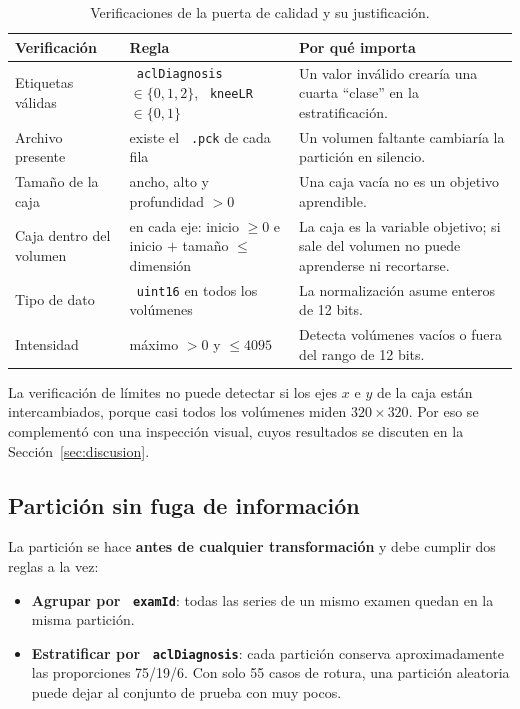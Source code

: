 \documentclass[12pt,letterpaper]{article}
\newcommand{\code}[1]{\texttt{\hyphenchar\font=-1 #1}}
\begin{document}
\begin{table}[!htbp]
\centering
\small
\caption{Verificaciones de la puerta de calidad y su justificación.}
\label{tab:qa}
\begin{tabular}{p{3.2cm}p{5.3cm}p{5.6cm}}
\toprule
Verificación & Regla & Por qué importa \\
\midrule
Etiquetas válidas & \code{aclDiagnosis} $\in\{0,1,2\}$, \code{kneeLR} $\in\{0,1\}$ & Un valor inválido crearía una cuarta ``clase'' en la estratificación. \\
Archivo presente & existe el \code{.pck} de cada fila & Un volumen faltante cambiaría la partición en silencio. \\
Tamaño de la caja & ancho, alto y profundidad $>0$ & Una caja vacía no es un objetivo aprendible. \\
Caja dentro del volumen & en cada eje: inicio $\geq 0$ e inicio $+$ tamaño $\leq$ dimensión & La caja es la variable objetivo; si sale del volumen no puede aprenderse ni recortarse. \\
Tipo de dato & \code{uint16} en todos los volúmenes & La normalización asume enteros de 12 bits. \\
Intensidad & máximo $>0$ y $\leq 4095$ & Detecta volúmenes vacíos o fuera del rango de 12 bits. \\
\bottomrule
\end{tabular}
\end{table}

\noindent La verificación de límites no puede detectar si los ejes $x$ e $y$ de la caja están intercambiados, porque casi todos los volúmenes miden $320\times320$. Por eso se complementó con una inspección visual, cuyos resultados se discuten en la Sección~\ref{sec:discusion}.

\subsection{Partición sin fuga de información}

La partición se hace \textbf{antes de cualquier transformación} y debe cumplir dos reglas a la vez:

\begin{itemize}[leftmargin=*]
  \item \textbf{Agrupar por \code{examId}}: todas las series de un mismo examen quedan en la misma partición.
  \item \textbf{Estratificar por \code{aclDiagnosis}}: cada partición conserva aproximadamente las proporciones 75/19/6. Con solo 55 casos de rotura, una partición aleatoria puede dejar al conjunto de prueba con muy pocos.
\end{itemize}
\end{document}
